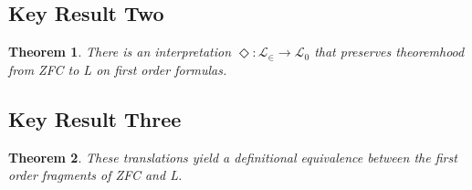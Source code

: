 \documentclass{article}
\newtheorem{theorem}{Theorem}
\begin{document}
\subsection{Key Result Two}
\begin{theorem}
There is an interpretation $\Diamond: \mathcal{L}_\in \to \mathcal{L}_0$ that preserves theoremhood from ZFC to L \emph{on first order formulas}. 
\end{theorem}

\subsection{Key Result Three}
\begin{theorem}
These translations yield a definitional equivalence between the first order fragments of ZFC and L. 
\end{theorem}
\end{document}
